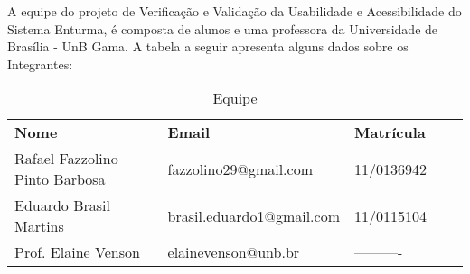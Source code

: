 
A equipe do projeto de Verificação e Validação da Usabilidade e Acessibilidade do Sistema Enturma, é composta de alunos e uma professora da Universidade de Brasília - UnB Gama. A tabela a seguir apresenta alguns dados sobre os Integrantes:

\begin{table}[!ht]
	\centering
	\label{equipe}
	\begin{tabular}{|l|l|l|ll}
		\cline{1-3}
		{\bf Nome}                     & {\bf Email}               & {\bf Matrícula} &  &  \\ \cline{1-3}
		Rafael Fazzolino Pinto Barbosa & fazzolino29@gmail.com     & 11/0136942      &  &  \\ \cline{1-3}
		Eduardo Brasil Martins         & brasil.eduardo1@gmail.com & 11/0115104      &  &  \\ \cline{1-3}
		Prof. Elaine Venson            & elainevenson@unb.br       & ----------      &  &  \\ \cline{1-3}
	\end{tabular}
	\caption{Equipe}
\end{table}
